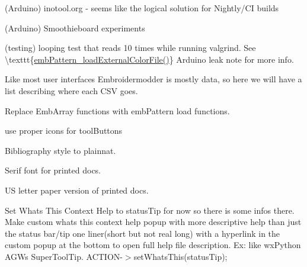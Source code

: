\begin{DoxyRefList}
\label{todo__todo000218}%
%
(Arduino) inotool.\+org -\/ seems like the logical solution for Nightly/\+CI builds

\label{todo__todo000219}%
%
(Arduino) Smoothieboard experiments

\label{todo__todo000220}%
%
(testing) looping test that reads 10 times while running valgrind. See \textbackslash{}texttt\{\mbox{\hyperlink{embroidery_8h_a3bf191bd99e2da8d36465f454a4646f6}{emb\+Pattern\+\_\+load\+External\+Color\+File()}}\} Arduino leak note for more info.

\label{todo__todo000221}%
%
Like most user interfaces Embroidermodder is mostly data, so here we will have a list describing where each CSV goes.

\label{todo__todo000222}%
%
Replace Emb\+Array functions with emb\+Pattern load functions. 
\item[Member \mbox{\hyperlink{embroidermodder_8h_a9e5c49167bfdbfabad312eb36ffbebd7}{group\+\_\+box\+\_\+ellipse\+\_\+geometry}} \mbox{[}\mbox{]}]\label{todo__todo000001}%
%
use proper icons for tool\+Buttons  
\item[Page \mbox{\hyperlink{_ideas}{Ideas}} ]\label{todo__todo000210}%
%
Bibliography style to plainnat.

\label{todo__todo000211}%
%
Serif font for printed docs.

\label{todo__todo000212}%
%
US letter paper version of printed docs. 
\item[Member \mbox{\hyperlink{class_main_window_a5de9bc12f363ba45fb8082f262d24deb}{Main\+Window\+::create\+All\+Actions}} ()]\label{todo__todo000003}%
%
Set What\textquotesingle{}s This Context Help to status\+Tip for now so there is some infos there. Make custom whats this context help popup with more descriptive help than just the status bar/tip one liner(short but not real long) with a hyperlink in the custom popup at the bottom to open full help file description. Ex\+: like wx\+Python AGW\textquotesingle{}s Super\+Tool\+Tip. ACTION-\/\texorpdfstring{$>$}{>}set\+Whats\+This(status\+Tip); 




\end{DoxyRefList}
